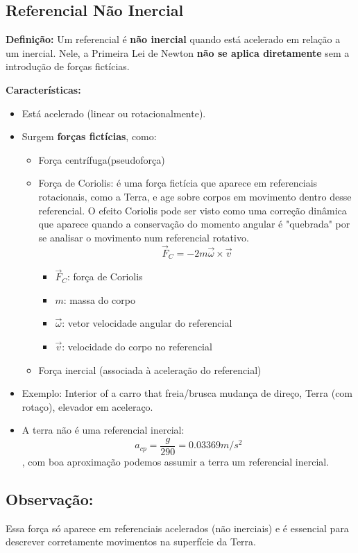 \documentclass[a4paper,12pt]{article}
\begin{document}
\begin{multicols}{2}
\subsection{Referencial Não Inercial}

\textbf{Definição:} Um referencial é \textbf{não inercial} quando está acelerado em relação a um inercial. Nele, a Primeira Lei de Newton \textbf{não se aplica diretamente} sem a introdução de forças fictícias.

\textbf{Características:}
\begin{itemize}
  \item Está acelerado (linear ou rotacionalmente).
  \item Surgem \textbf{forças fictícias}, como:
  \begin{itemize}
    \item Força centrífuga(pseudoforça)
    \item Força de Coriolis: é uma força fictícia que aparece em referenciais rotacionais, como a Terra, e age 
    sobre corpos em movimento dentro desse referencial.
    O efeito Coriolis pode ser visto como uma correção dinâmica que aparece quando a conservação do momento angular 
    é "quebrada" por se analisar o movimento num referencial rotativo.
    \[
        \vec{F}_C = -2m \vec{\omega} \times \vec{v}
    \]
    \begin{itemize}
        \item \( \vec{F}_C \): força de Coriolis
        \item \( m \): massa do corpo
        \item \( \vec{\omega} \): vetor velocidade angular do referencial
        \item \( \vec{v} \): velocidade do corpo no referencial
    \end{itemize}
    \item Força inercial (associada à aceleração do referencial)
  \end{itemize}
  \item Exemplo: Interior of a carro that freia/brusca mudança de direço, Terra (com rotaço), elevador em aceleraço.
  \item A terra não é uma referencial inercial: $$a_{cp} = \frac{g}{290} = 0.03369 m/s^2$$, com boa aproximação podemos assumir a terra um referencial inercial.
\end{itemize}

\subsection{Observação:}
Essa força só aparece em referenciais acelerados (não inerciais) e é essencial para descrever corretamente movimentos na superfície da Terra.



\end{multicols}
\end{document}
